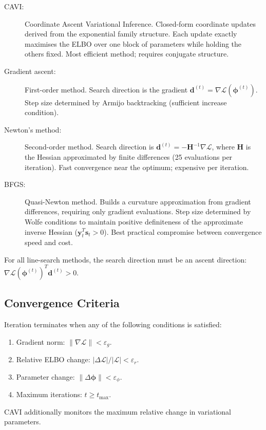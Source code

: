 \documentclass[11pt,a4paper]{article}
\begin{document}
\begin{description}
  \item[CAVI:] Coordinate Ascent Variational Inference.
    Closed-form coordinate updates derived from the exponential family structure.
    Each update exactly maximises the ELBO over one block of parameters while holding
    the others fixed.
    Most efficient method; requires conjugate structure.
  \item[Gradient ascent:] First-order method.
    Search direction is the gradient $\bm{d}^{(t)} = \nabla\mathcal{L}(\bm{\phi}^{(t)})$.
    Step size determined by Armijo backtracking (sufficient increase condition).
  \item[Newton's method:] Second-order method.
    Search direction is $\bm{d}^{(t)} = -\bm{H}^{-1}\nabla\mathcal{L}$,
    where $\bm{H}$ is the Hessian approximated by finite differences (25 evaluations
    per iteration).
    Fast convergence near the optimum; expensive per iteration.
  \item[BFGS:] Quasi-Newton method.
    Builds a curvature approximation from gradient differences, requiring only
    gradient evaluations.
    Step size determined by Wolfe conditions to maintain positive definiteness of
    the approximate inverse Hessian ($\bm{y}_t^T\bm{s}_t > 0$).
    Best practical compromise between convergence speed and cost.
\end{description}

For all line-search methods, the search direction must be an ascent direction:
$\nabla\mathcal{L}(\bm{\phi}^{(t)})^T\bm{d}^{(t)} > 0$.

\subsection{Convergence Criteria}

Iteration terminates when any of the following conditions is satisfied:
\begin{enumerate}[label=(\roman*)]
  \item Gradient norm: $\lVert\nabla\mathcal{L}\rVert < \varepsilon_g$.
  \item Relative ELBO change: $|\Delta\mathcal{L}|/|\mathcal{L}| < \varepsilon_r$.
  \item Parameter change: $\lVert\Delta\bm{\phi}\rVert < \varepsilon_\phi$.
  \item Maximum iterations: $t \geq t_{\max}$.
\end{enumerate}
CAVI additionally monitors the maximum relative change in variational parameters.
\end{document}
